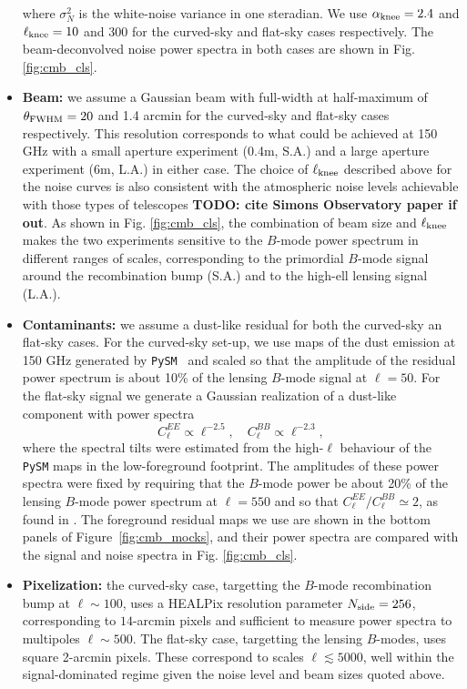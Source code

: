 \documentclass[usenatbib]{mnrasb}
\newcommand{\todo}[1]{{\bf TODO: #1}}
\newcommand{\todo}[1]{}
\begin{document}
\begin{itemize}
          where $\sigma_N^2$ is the white-noise variance in one steradian. We use $\alpha_{\rm knee}=2.4$ and $\ell_{\rm knee}=10$ and 300 for the curved-sky and flat-sky cases respectively. The beam-deconvolved noise power spectra in both cases are shown in Fig. \ref{fig:cmb_cls}.
          \item {\bf Beam:} we assume a Gaussian beam with full-width at half-maximum of $\theta_{\rm FWHM}=20$ and 1.4 arcmin for the curved-sky and flat-sky cases respectively. This resolution corresponds to what could be achieved at 150 GHz with a small aperture experiment (0.4m, S.A.) and a large aperture experiment (6m, L.A.) in either case. The choice of $\ell_{\rm knee}$ described above for the noise curves is also consistent with the atmospheric noise levels achievable with those types of telescopes \todo{cite Simons Observatory paper if out}. As shown in Fig. \ref{fig:cmb_cls}, the combination of beam size and $\ell_{\rm knee}$ makes the two experiments sensitive to the $B$-mode power spectrum in different ranges of scales, corresponding to the primordial $B$-mode signal around the recombination bump (S.A.) and to the high-ell lensing signal (L.A.).
          \item {\bf Contaminants:} we assume a dust-like residual for both the curved-sky an flat-sky cases. For the curved-sky set-up, we use maps of the dust emission at 150 GHz generated by {\tt PySM}~\citep{2017MNRAS.469.2821T} and scaled so that the amplitude of the residual power spectrum is about 10\% of the lensing $B$-mode signal at $\ell=50$. For the flat-sky signal we generate a Gaussian realization of a dust-like component with power spectra
          \begin{equation}
            C_\ell^{EE}\propto\ell^{-2.5},\hspace{12pt}
            C_\ell^{BB}\propto\ell^{-2.3},
          \end{equation}
          where the spectral tilts were estimated from the high-$\ell$ behaviour of the {\tt PySM} maps in the low-foreground footprint. The amplitudes of these power spectra were fixed by requiring that the $B$-mode power be about 20\% of the lensing $B$-mode power spectrum at $\ell=550$ and so that $C_\ell^{EE}/C_\ell^{BB}\simeq2$, as found in \citet{2016A&A...594A..13P}. The foreground residual maps we use are shown in the bottom panels of Figure~\ref{fig:cmb_mocks}, and their power spectra are compared with the signal and noise spectra in Fig. \ref{fig:cmb_cls}.
          \item {\bf Pixelization:} the curved-sky case, targetting the $B$-mode recombination bump at $\ell\sim100$, uses a HEALPix resolution parameter $N_{\rm side}=256$, corresponding to $14$-arcmin pixels and sufficient to measure power spectra to multipoles $\ell\sim500$. The flat-sky case, targetting the lensing $B$-modes, uses square 2-arcmin pixels. These correspond to scales $\ell\lesssim5000$, well within the signal-dominated regime given the noise level and beam sizes quoted above.
        \end{itemize}
\end{document}
